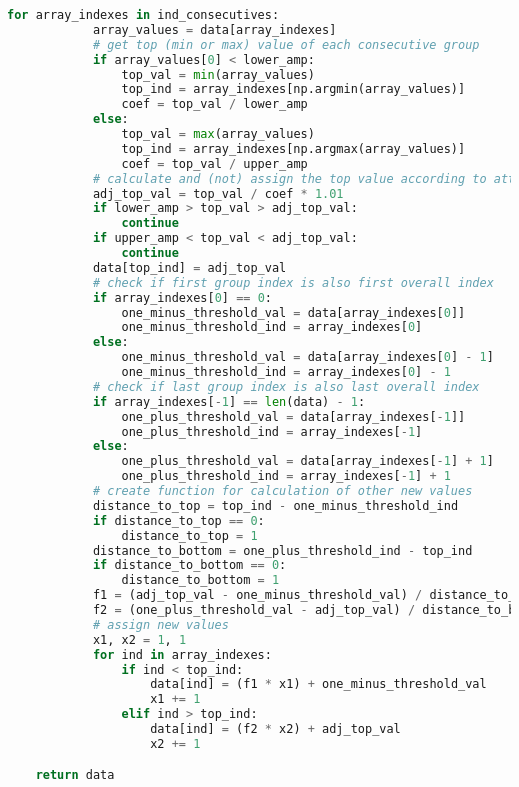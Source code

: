 \begin{lstlisting}[language=Python,label={lst:filters.py}, basicstyle=\scriptsize]
        for array_indexes in ind_consecutives:
            array_values = data[array_indexes]
            # get top (min or max) value of each consecutive group
            if array_values[0] < lower_amp:
                top_val = min(array_values)
                top_ind = array_indexes[np.argmin(array_values)]
                coef = top_val / lower_amp
            else:
                top_val = max(array_values)
                top_ind = array_indexes[np.argmax(array_values)]
                coef = top_val / upper_amp
            # calculate and (not) assign the top value according to attenuating coefficient
            adj_top_val = top_val / coef * 1.01
            if lower_amp > top_val > adj_top_val:
                continue
            if upper_amp < top_val < adj_top_val:
                continue
            data[top_ind] = adj_top_val
            # check if first group index is also first overall index
            if array_indexes[0] == 0:
                one_minus_threshold_val = data[array_indexes[0]]
                one_minus_threshold_ind = array_indexes[0]
            else:
                one_minus_threshold_val = data[array_indexes[0] - 1]
                one_minus_threshold_ind = array_indexes[0] - 1
            # check if last group index is also last overall index
            if array_indexes[-1] == len(data) - 1:
                one_plus_threshold_val = data[array_indexes[-1]]
                one_plus_threshold_ind = array_indexes[-1]
            else:
                one_plus_threshold_val = data[array_indexes[-1] + 1]
                one_plus_threshold_ind = array_indexes[-1] + 1
            # create function for calculation of other new values
            distance_to_top = top_ind - one_minus_threshold_ind
            if distance_to_top == 0:
                distance_to_top = 1
            distance_to_bottom = one_plus_threshold_ind - top_ind
            if distance_to_bottom == 0:
                distance_to_bottom = 1
            f1 = (adj_top_val - one_minus_threshold_val) / distance_to_top
            f2 = (one_plus_threshold_val - adj_top_val) / distance_to_bottom
            # assign new values
            x1, x2 = 1, 1
            for ind in array_indexes:
                if ind < top_ind:
                    data[ind] = (f1 * x1) + one_minus_threshold_val
                    x1 += 1
                elif ind > top_ind:
                    data[ind] = (f2 * x2) + adj_top_val
                    x2 += 1

    return data

\end{lstlisting}

